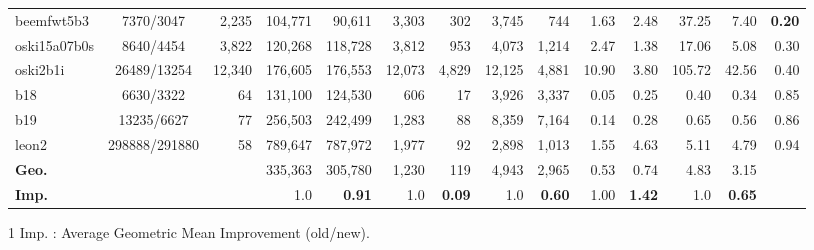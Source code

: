 \documentclass[conference]{IEEEtran}
\begin{document}
\begin{table}[t]
\begin{threeparttable}
\begin{tabular*}{\hsize}{@{}@{\extracolsep{\fill}}lcrrrrrrrrrrrr@{}}
  beemfwt5b3   & 7370/3047     & 2,235   & 104,771    & 90,611    & 3,303   & 302    & 3,745   & 744    & 1.63   & 2.48  & 37.25   & 7.40   & {\bf 0.20}   \\ 
  oski15a07b0s & 8640/4454     & 3,822   & 120,268    & 118,728   & 3,812   & 953    & 4,073   & 1,214  & 2.47   & 1.38  & 17.06   & 5.08   & 0.30   \\ 
  oski2b1i     & 26489/13254   & 12,340  & 176,605    & 176,553   & 12,073  & 4,829  & 12,125  & 4,881  & 10.90  & 3.80  & 105.72  & 42.56  & 0.40   \\ 
  b18          & 6630/3322     & 64      & 131,100    & 124,530   & 606     & 17     & 3,926   & 3,337  & 0.05   & 0.25  & 0.40    & 0.34   & 0.85   \\ 
  b19          & 13235/6627    & 77      & 256,503    & 242,499   & 1,283   & 88     & 8,359   & 7,164  & 0.14   & 0.28  & 0.65    & 0.56   & 0.86   \\ 
  leon2        & 298888/291880 & 58      & 789,647    & 787,972   & 1,977   & 92     & 2,898   & 1,013  & 1.55   & 4.63  & 5.11    & 4.79   & 0.94   \\ 
  \midrule
  {\bf Geo.} & ~ & ~ & 335,363  & 305,780  & 1,230  & 119  & 4,943  & 2,965  & 0.53  & 0.74  & 4.83  & 3.15  &   \\ 
  {\bf Imp.} & ~ & ~ & 1.0  & {\bf 0.91}  & 1.0  & {\bf 0.09}  & 1.0  & {\bf 0.60}  & 1.00 & {\bf 1.42}  & 1.0  & {\bf 0.65}  & ~\\ 
  \bottomrule
  \end{tabular*}
  \begin{tablenotes}
    \footnotesize
    \item[1] Imp. : Average Geometric Mean Improvement (old/new).
    \end{tablenotes}
  \end{threeparttable}
  \end{table}
\end{document}
